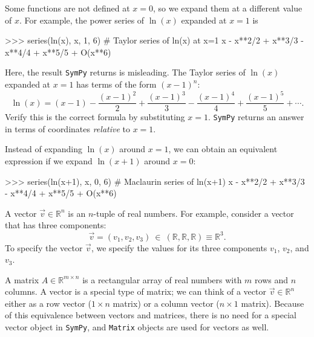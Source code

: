 \noindent
Some functions are not defined at $x=0$, so we expand them at a different value of $x$.
For example, the power series of $\ln(x)$ expanded at $x=1$ is

\small
\begin{verbatimtab}
>>> series(ln(x), x, 1, 6)     # Taylor series of ln(x) at x=1
x - x**2/2 + x**3/3 - x**4/4 + x**5/5  + O(x**6)    
\end{verbatimtab}
\normalsize

\noindent
Here, the result \texttt{SymPy} returns is misleading.
The Taylor series of $\ln(x)$ expanded at $x=1$ has terms of the form $(x-1)^n$:
\[
  \ln(x) = (x-1) - \frac{(x-1)^2}{2} + \frac{(x-1)^3}{3} - \frac{(x-1)^4}{4} + \frac{(x-1)^5}{5} + \cdots.
\]
Verify this is the correct formula by substituting $x=1$.
\texttt{SymPy} returns an answer in terms of coordinates \emph{relative} to $x=1$.

Instead of expanding $\ln(x)$ around $x=1$,
we can obtain an equivalent expression if we expand $\ln(x+1)$ around $x=0$:



\small
\begin{verbatimtab}
>>> series(ln(x+1), x, 0, 6)   # Maclaurin series of ln(x+1)
x - x**2/2 + x**3/3 - x**4/4 + x**5/5 + O(x**6)
\end{verbatimtab}
\normalsize




\label{sec:sympytut_vectors}

A vector $\vec{v} \in \mathbb{R}^n$ is an $n$-tuple of real numbers. 										
For example, consider a vector that has three components:  
\[
 \vec{v} = (v_1,v_2,v_3) \  \in \  (\mathbb{R},\mathbb{R},\mathbb{R}) \equiv \mathbb{R}^3.
\]
To specify the vector $\vec{v}$, 
we specify the values for its three components $v_1$, $v_2$, and $v_3$. 

A matrix $A \in \mathbb{R}^{m\times n}$ is a rectangular array of real numbers with $m$ rows and $n$ columns.
A vector is a special type of matrix; we can think of a vector $\vec{v}\in \mathbb{R}^n$
either as a row vector ($1\times n$ matrix) or a column vector ($n \times 1$ matrix).
Because of this equivalence between vectors and matrices,
there is no need for a special vector object in \texttt{SymPy}, 
and \texttt{Matrix} objects are used for vectors as well.

